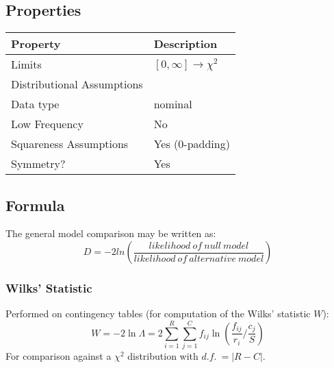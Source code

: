 \documentclass[11pt]{article}
\begin{document}
\subsection{Properties}
\begin{tabular}{| l || l |}
    \hline
    {\bf Property} & {\bf Description} \\
    \hline
    Limits & $[0, \infty] \to \chi^2$ \\ \hline

    Distributional Assumptions&  \\ \hline

    Data type & nominal \\ \hline

    Low Frequency & No \\ \hline

    Squareness Assumptions & Yes (0-padding) \\ \hline
    
    Symmetry? & Yes \\ \hline

\end{tabular}


\subsection{Formula}

The general model comparison may be written as:
$$
D = -2ln \left( \frac{ likelihood~of~null~model }{ likelihood~of~alternative~model } \right)
$$

\subsubsection{Wilks' Statistic}
Performed on contingency tables (for computation of the Wilks' statistic $W$):
$$
W = -2\ln\Lambda = 2 \sum_{i=1}^{R}{ \sum_{j=1}^{C}{ f_{ij}\ln \left( { \frac{f_{ij}}{r_i}  \bigg/  \frac{c_j}{S}  }  \right)   }}
$$
For comparison against a $\chi^2$ distribution with $d.f.~= |R-C|$.
\end{document}
